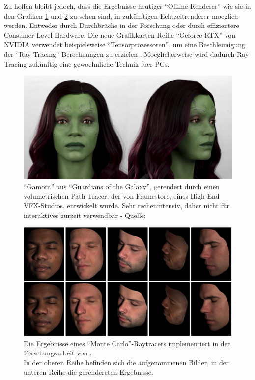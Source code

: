 \documentclass[ngerman,runningheads,a4paper]{llncs}[2018/03/10]
\begin{document}
Zu hoffen bleibt jedoch, dass die Ergebnisse heutiger \enquote{Offline-Renderer} wie sie in den Grafiken \ref{fig:outlook-volumetric-path-tracer} und \ref{fig:outlook-monte-carlo-ray-tracer} zu sehen sind, in zukünftigen Echtzeitrenderer moeglich werden.
Entweder durch Durchbrüche in der Forschung oder durch effizientere Consumer-Level-Hardware.
Die neue Grafikkarten-Reihe \enquote{Geforce RTX} von NVIDIA verwendet beispielsweise \enquote{Tensorprozessoren}, um eine Beschleunigung der \enquote{Ray Tracing}-Berechnungen zu erzielen \cite{forbes-tensor-rtx}.
Moeglicherweise wird dadurch Ray Tracing zukünftig eine gewoehnliche Technik fuer PCs.

\begin{figure}
\includegraphics[scale=0.275,keepaspectratio]{./images/framestore-digital-gamora.jpg}
\caption{\enquote{Gamora} aus \enquote{Guardians of the Galaxy}, gerendert durch einen volumetrischen Path Tracer, der von Framestore, eines High-End VFX-Studios, entwickelt wurde. Sehr rechenintensiv, daher nicht für interaktives zurzeit verwendbar - Quelle: \cite{volumetric-path-tracer}}
\label{fig:outlook-volumetric-path-tracer}
\end{figure}

\begin{figure}
\includegraphics[scale=0.275,keepaspectratio]{./images/monte-carlo-ray-tracer.jpg}
\caption{Die Ergebnisse eines \enquote{Monte Carlo}-Raytracers implementiert in der Forschungsarbeit von \citet{weyrich2006analysis}.\\\hspace{\textwidth}In der oberen Reihe befinden sich die aufgenommenen Bilder, in der unteren Reihe die gerendereten Ergebnisse.}
\label{fig:outlook-monte-carlo-ray-tracer}
\end{figure}
\end{document}
